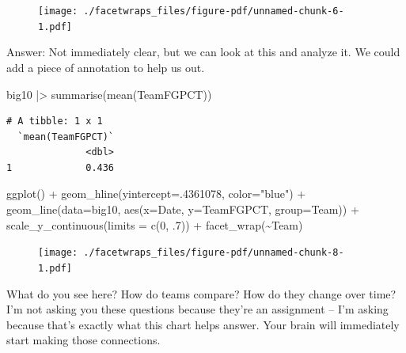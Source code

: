 \documentclass[
  letterpaper,
  DIV=11,
  numbers=noendperiod]{scrreprt}
\newenvironment{Shaded}{\begin{snugshade}}{\end{snugshade}}
\newcommand{\AttributeTok}[1]{\textcolor[rgb]{0.40,0.45,0.13}{#1}}
\newcommand{\DecValTok}[1]{\textcolor[rgb]{0.68,0.00,0.00}{#1}}
\newcommand{\FunctionTok}[1]{\textcolor[rgb]{0.28,0.35,0.67}{#1}}
\newcommand{\NormalTok}[1]{\textcolor[rgb]{0.00,0.23,0.31}{#1}}
\newcommand{\SpecialCharTok}[1]{\textcolor[rgb]{0.37,0.37,0.37}{#1}}
\newcommand{\StringTok}[1]{\textcolor[rgb]{0.13,0.47,0.30}{#1}}
\begin{document}
\begin{figure}[H]

{\centering \texttt{[image: ./facetwraps\_files/figure-pdf/unnamed-chunk-6-1.pdf]}

}

\end{figure}

Answer: Not immediately clear, but we can look at this and analyze it.
We could add a piece of annotation to help us out.

\begin{Shaded}
\begin{Highlighting}[]
\NormalTok{big10 }\SpecialCharTok{|\textgreater{}} \FunctionTok{summarise}\NormalTok{(}\FunctionTok{mean}\NormalTok{(TeamFGPCT))}
\end{Highlighting}
\end{Shaded}

\begin{verbatim}
# A tibble: 1 x 1
  `mean(TeamFGPCT)`
              <dbl>
1             0.436
\end{verbatim}

\begin{Shaded}
\begin{Highlighting}[]
\FunctionTok{ggplot}\NormalTok{() }\SpecialCharTok{+} 
  \FunctionTok{geom\_hline}\NormalTok{(}\AttributeTok{yintercept=}\NormalTok{.}\DecValTok{4361078}\NormalTok{, }\AttributeTok{color=}\StringTok{"blue"}\NormalTok{) }\SpecialCharTok{+} 
  \FunctionTok{geom\_line}\NormalTok{(}\AttributeTok{data=}\NormalTok{big10, }\FunctionTok{aes}\NormalTok{(}\AttributeTok{x=}\NormalTok{Date, }\AttributeTok{y=}\NormalTok{TeamFGPCT, }\AttributeTok{group=}\NormalTok{Team)) }\SpecialCharTok{+} 
  \FunctionTok{scale\_y\_continuous}\NormalTok{(}\AttributeTok{limits =} \FunctionTok{c}\NormalTok{(}\DecValTok{0}\NormalTok{, .}\DecValTok{7}\NormalTok{)) }\SpecialCharTok{+} 
  \FunctionTok{facet\_wrap}\NormalTok{(}\SpecialCharTok{\textasciitilde{}}\NormalTok{Team)}
\end{Highlighting}
\end{Shaded}

\begin{figure}[H]

{\centering \texttt{[image: ./facetwraps\_files/figure-pdf/unnamed-chunk-8-1.pdf]}

}

\end{figure}

What do you see here? How do teams compare? How do they change over
time? I'm not asking you these questions because they're an assignment
-- I'm asking because that's exactly what this chart helps answer. Your
brain will immediately start making those connections.
\end{document}
